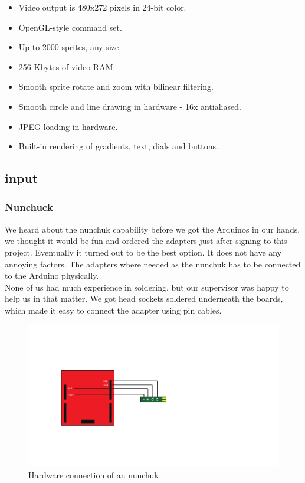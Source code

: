 \begin{itemize}
  \footnotesize
  \item Video output is 480x272 pixels in 24-bit color.
  \item OpenGL-style command set.
  \item Up to 2000 sprites, any size.
  \item 256 Kbytes of video RAM.
  \item Smooth sprite rotate and zoom with bilinear filtering.
  \item Smooth circle and line drawing in hardware - 16x antialiased.
  \item JPEG loading in hardware.
  \item Built-in rendering of gradients, text, dials and buttons.
\end{itemize}


\subsection{input}


\subsubsection{Nunchuck}%

We heard about the nunchuk capability before we got the Arduinos in our 
hands, we thought it would be fun and ordered the adapters just after signing
to this project. Eventually it turned out to be the best option. It does
not have any annoying factors. The adapters where needed as the nunchuk
has to be connected to the Arduino physically.
\\
None of us had much experience in soldering, but our supervisor was happy
to help us in that matter. We got head sockets soldered underneath
the boards, which made it easy to connect the adapter using pin cables.

\begin{figure}[h]
  \centering
  \includegraphics{Figures/NunchuckConnection}
  \caption{Hardware connection of an nunchuk}
  \label{fig:nunchuk_connect}
\end{figure}


